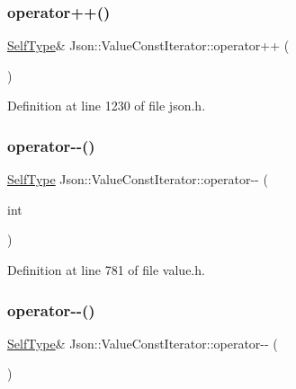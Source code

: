 \subsubsection{\texorpdfstring{operator++()}{operator++()}\hspace{0.1cm}{\footnotesize\ttfamily [4/4]}}
{\footnotesize\ttfamily \hyperlink{class_json_1_1_value_iterator_base_a9d2a940d03ea06d20d972f41a89149ee}{Self\+Type}\& Json\+::\+Value\+Const\+Iterator\+::operator++ (\begin{DoxyParamCaption}{ }\end{DoxyParamCaption})\hspace{0.3cm}{\ttfamily [inline]}}



Definition at line 1230 of file json.\+h.

\hypertarget{class_json_1_1_value_const_iterator_a94935961e9331c6f7b907b05ec8df75e}{}\label{class_json_1_1_value_const_iterator_a94935961e9331c6f7b907b05ec8df75e} 
\subsubsection{\texorpdfstring{operator-\/-\/()}{operator--()}\hspace{0.1cm}{\footnotesize\ttfamily [1/4]}}
{\footnotesize\ttfamily \hyperlink{class_json_1_1_value_iterator_base_a9d2a940d03ea06d20d972f41a89149ee}{Self\+Type} Json\+::\+Value\+Const\+Iterator\+::operator-\/-\/ (\begin{DoxyParamCaption}\item[{int}]{ }\end{DoxyParamCaption})\hspace{0.3cm}{\ttfamily [inline]}}



Definition at line 781 of file value.\+h.

\hypertarget{class_json_1_1_value_const_iterator_a31415e44e44e56fb2bfda7e8bb784646}{}\label{class_json_1_1_value_const_iterator_a31415e44e44e56fb2bfda7e8bb784646} 
\subsubsection{\texorpdfstring{operator-\/-\/()}{operator--()}\hspace{0.1cm}{\footnotesize\ttfamily [2/4]}}
{\footnotesize\ttfamily \hyperlink{class_json_1_1_value_iterator_base_a9d2a940d03ea06d20d972f41a89149ee}{Self\+Type}\& Json\+::\+Value\+Const\+Iterator\+::operator-\/-\/ (\begin{DoxyParamCaption}{ }\end{DoxyParamCaption})\hspace{0.3cm}{\ttfamily [inline]}}



